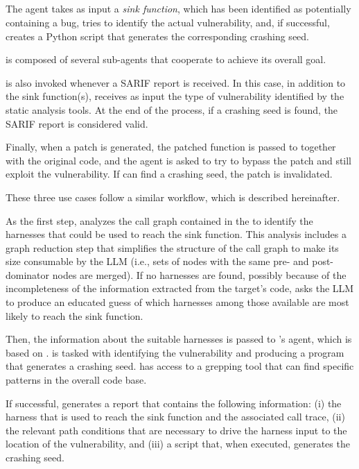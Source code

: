 \subsection{\discoveryguy}

The \discoveryguy agent takes as input a \emph{sink function}, which has been identified as potentially containing a bug, tries to identify the actual vulnerability, and, if successful, creates a Python script that generates the corresponding crashing seed.

\discoveryguy is composed of several sub-agents that cooperate to achieve its overall goal.

\discoveryguy is also invoked whenever a SARIF report is received.
In this case, in addition to the sink function(s), \discoveryguy receives as input the type of vulnerability identified by the static analysis tools.
At the end of the process, if a crashing seed is found, the SARIF report is considered valid.

Finally, when a patch is generated, the patched function is passed to \discoveryguy together with the original code, and the agent is asked to try to bypass the patch and still exploit the vulnerability.
If \discoveryguy can find a crashing seed, the patch is invalidated.

These three use cases follow a similar workflow, which is described hereinafter.

As the first step, \discoveryguy analyzes the call graph contained in the \analysisgraph to identify the harnesses that could be used to reach the sink function.
This analysis includes a graph reduction step that simplifies the structure of the call graph to make its size consumable by the LLM (i.e., sets of nodes with the same pre- and post-dominator nodes are merged).
If no harnesses are found, possibly because of the incompleteness of the information extracted from the target's code, \discoveryguy asks the LLM to produce an educated guess of which harnesses among those available are most likely to reach the sink function.

Then, the information about the suitable harnesses is passed to \discoveryguy's \jimmypwn agent, which is based on \claudefour.
\jimmypwn is tasked with identifying the vulnerability and producing a program that generates a crashing seed. \jimmypwn has access to a grepping tool that can find specific patterns in the overall code base.

If successful, \jimmypwn generates a report that contains the following information: (i) the harness that is used to reach the sink function and the associated call trace, (ii) the relevant path conditions that are necessary to drive the harness input to the location of the vulnerability, and (iii) a script that, when executed, generates the crashing seed.

